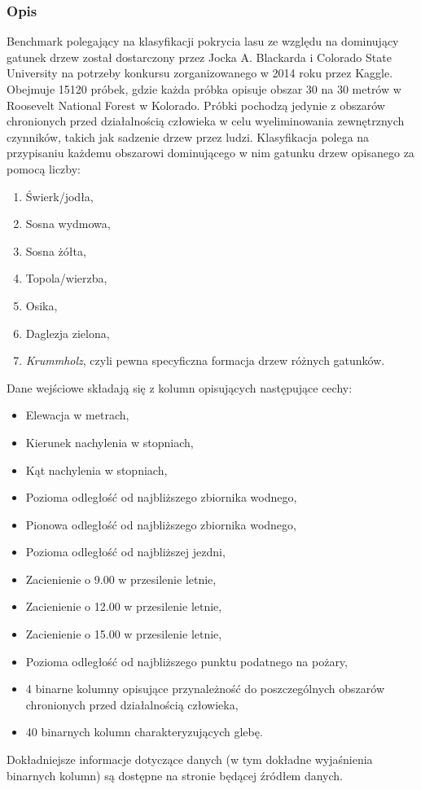 \documentclass{article}
\begin{document}
\subsubsection{Opis}
Benchmark polegający na klasyfikacji pokrycia lasu ze względu na dominujący gatunek drzew został dostarczony przez Jocka A. Blackarda i Colorado State University na potrzeby konkursu zorganizowanego w 2014 roku przez Kaggle. Obejmuje 15120 próbek, gdzie każda próbka opisuje obszar 30 na 30 metrów w Roosevelt National Forest w Kolorado. Próbki pochodzą jedynie z obszarów chronionych przed działalnością człowieka w celu wyeliminowania zewnętrznych czynników, takich jak sadzenie drzew przez ludzi. Klasyfikacja polega na przypisaniu każdemu obszarowi dominującego w nim gatunku drzew opisanego za pomocą liczby:
\begin{enumerate}
\item Świerk/jodła,
\item Sosna wydmowa,
\item Sosna żółta,
\item Topola/wierzba,
\item Osika,
\item Daglezja zielona,
\item \textit{Krummholz}, czyli pewna specyficzna formacja drzew różnych gatunków.
\end{enumerate}
Dane wejściowe składają się z kolumn opisujących następujące cechy:
\begin{itemize}
\item Elewacja w metrach,
\item Kierunek nachylenia w stopniach,
\item Kąt nachylenia w stopniach,
\item Pozioma odległość od najbliższego zbiornika wodnego,
\item Pionowa odległość od najbliższego zbiornika wodnego,
\item Pozioma odległość od najbliższej jezdni,
\item Zacienienie o 9.00 w przesilenie letnie,
\item Zacienienie o 12.00 w przesilenie letnie,
\item Zacienienie o 15.00 w przesilenie letnie,
\item Pozioma odległość od najbliższego punktu podatnego na pożary,
\item 4 binarne kolumny opisujące przynależność do poszczególnych obszarów chronionych przed działalnością człowieka,
\item 40 binarnych kolumn charakteryzujących glebę.
\end{itemize}
Dokładniejsze informacje dotyczące danych (w tym dokładne wyjaśnienia binarnych kolumn) są dostępne na stronie będącej źródłem danych. 
\end{document}
